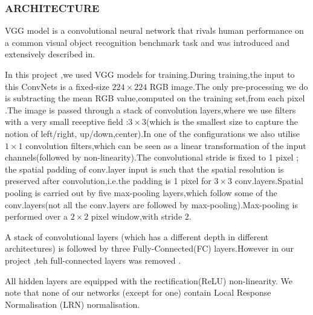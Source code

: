 \documentclass[10pt,a4paper]{article}
\begin{document}
	\subsubsection{ARCHITECTURE}
	
	VGG model is a convolutional neural network that rivals human performance 
	on a common visual object recognition benchmark task and was introduced and 
	extensively described in\cite{Simonyan2014Very}. 
	
	In this project ,we used VGG\cite{Simonyan2014Very} models for training.During training,the input
	to this ConvNets is a fixed-size $224\times224$ RGB image.The only pre-processing we do is subtracting the mean RGB value,computed on the training set,from each pixel .The image is passed through a stack of 
	convolution layers,where we use filters with a very small receptive field
	:$3\times 3$(which is the smallest size to capture the notion of left/right,
	up/down,center).In one of the configurations we also utilise $1\times1$ convolution filters,which can be seen as a linear transformation of the
	input channels(followed by non-linearity).The convolutional stride is fixed 
	to 1 pixel ; the spatial padding of conv.layer input is such that the spatial
	resolution is preserved after convolution,i.e.the padding is 1 pixel for $3\times 3$ conv.layers.Spatial pooling is carried out by five max-pooling
	layers,which follow some of the conv.layers(not all the conv.layers are followed by max-pooling).Max-pooling is performed over a $2\times 2$ pixel 
	window,with stride 2.
	
	A stack of convolutional layers (which has a different depth in different 
	architectures) is followed by three Fully-Connected(FC) layers.However in our 
	project ,teh full-connected layers was removed .
	
	All hidden layers are equipped with the rectification(ReLU) non-linearity.
	We note that none of our networks (except for one) contain Local Response
	Normalisation (LRN) normalisation.
	
\end{document}
